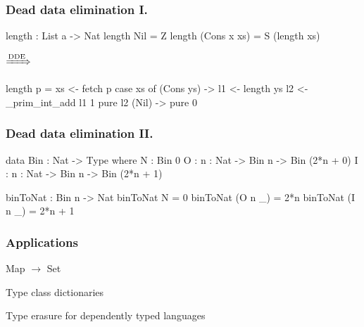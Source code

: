\documentclass[bigger]{beamer}
\begin{document}
\begin{frame}[fragile]
\frametitle{Dead data elimination I.}

\begin{center}
	\begin{minipage}{0.30\textwidth}
		\begin{haskellcode}
			length : List a -> Nat
			length Nil = Z
			length (Cons x xs) 
			  = S (length xs)
		\end{haskellcode}
	\end{minipage}
	\hspace{1cm}
	$\xRightarrow{\text{DDE}}$
	\hfill
	\begin{minipage}{0.5\textwidth}
		\begin{haskellcode}
			length p =
			 xs <- fetch p
			 case xs of
			  (Cons ys) ->
			   l1 <- length ys
			   l2 <- _prim_int_add l1 1
			   pure l2
			  (Nil) ->
			    pure 0
		\end{haskellcode}
	\end{minipage}
\end{center}

\end{frame}


\begin{frame}[fragile]
\frametitle{Dead data elimination II.}

\begin{center}
	\begin{minipage}{0.85\textwidth}
		\begin{haskellcode}
			data Bin : Nat -> Type where
			  N : Bin 0
			  O : {n : Nat} -> Bin n -> Bin (2*n + 0)
			  I : {n : Nat} -> Bin n -> Bin (2*n + 1)
		\end{haskellcode}
		\vspace{0.5cm}
		\pause
		\begin{haskellcode}
			binToNat : Bin n -> Nat
			binToNat N = 0
			binToNat (O {n} _) = 2*n
			binToNat (I {n} _) = 2*n + 1
		\end{haskellcode}
	\end{minipage}
\end{center}

\end{frame}


\begin{frame}
\frametitle{Applications}

	\begin{vfitemize}
		\item Map $\rightarrow$ Set
		\item Type class dictionaries
		\item Type erasure for dependently typed languages
	\end{vfitemize}

\end{frame} 
\end{document}
